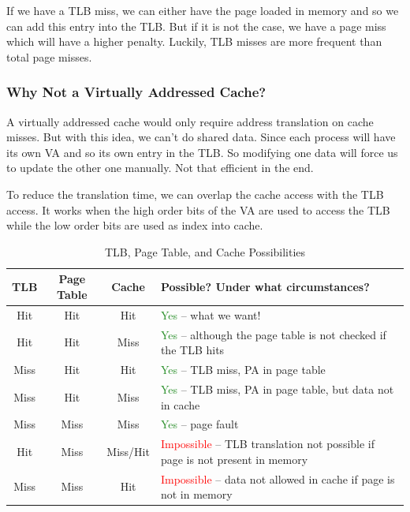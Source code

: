 \documentclass{report}
\begin{document}
If we have a TLB miss, we can either have the page loaded in memory and so we can add this entry into the TLB. But if it is not the case, we have a page miss which will have a higher penalty. Luckily, TLB misses are more frequent than total page misses.

\subsubsection{Why Not a Virtually Addressed Cache?}

A virtually addressed cache would only require address translation on cache misses. But with this idea, we can't do shared data. Since each process will have its own VA and so its own entry in the TLB. So modifying one data will force us to update the other one manually. Not that efficient in the end.

To reduce the translation time, we can overlap the cache access with the TLB access. It works when the high order bits of the VA are used to access the TLB while the low order bits are used as index into cache.

\begin{table}[H]
    \centering
    \begin{tabular}{|c|c|c||m{8cm}|}
        \hline
        \textbf{TLB} & \textbf{Page Table} & \textbf{Cache} & \textbf{Possible? Under what circumstances?} \\
        \hline
        \hline
        Hit & Hit & Hit & \textcolor{ForestGreen}{Yes} -- what we want! \\
        \hline
        Hit & Hit & Miss & \textcolor{ForestGreen}{Yes} -- although the page table is not checked if the TLB hits \\
        \hline
        Miss & Hit & Hit & \textcolor{ForestGreen}{Yes} -- TLB miss, PA in page table \\
        \hline
        Miss & Hit & Miss & \textcolor{ForestGreen}{Yes} -- TLB miss, PA in page table, but data not in cache \\
        \hline
        Miss & Miss & Miss & \textcolor{ForestGreen}{Yes} -- page fault \\
        \hline
        Hit & Miss & Miss/Hit & \textcolor{red}{Impossible} -- TLB translation not possible if page is not present in memory \\
        \hline
        Miss & Miss & Hit & \textcolor{red}{Impossible} -- data not allowed in cache if page is not in memory \\
        \hline
    \end{tabular}
    \caption{TLB, Page Table, and Cache Possibilities}
    \label{tab:tlb_page_table_cache}
\end{table}
\end{document}
